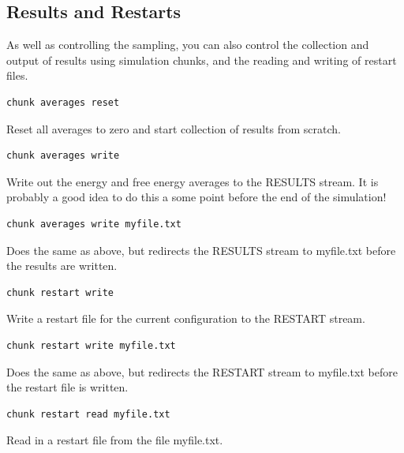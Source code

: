 \documentclass[letterpaper,10pt,english]{sphinxmanual}
\begin{document}
\subsection{Results and Restarts}
\label{protoms:results-and-restarts}
As well as controlling the sampling, you can also control the collection and output of results using simulation chunks, and the reading and writing of restart files.

\begin{Verbatim}[commandchars=\\\{\}]
chunk averages reset
\end{Verbatim}

Reset all averages to zero and start collection of results from scratch.

\begin{Verbatim}[commandchars=\\\{\}]
chunk averages write
\end{Verbatim}

Write out the energy and free energy averages to the RESULTS stream. It is probably a good idea to do this a some point before the end of the simulation!

\begin{Verbatim}[commandchars=\\\{\}]
chunk averages write myfile.txt
\end{Verbatim}

Does the same as above, but redirects the RESULTS stream to myfile.txt before the results are written.

\begin{Verbatim}[commandchars=\\\{\}]
chunk restart write
\end{Verbatim}

Write a restart file for the current configuration to the RESTART stream.

\begin{Verbatim}[commandchars=\\\{\}]
chunk restart write myfile.txt
\end{Verbatim}

Does the same as above, but redirects the RESTART stream to myfile.txt before the restart file is written.

\begin{Verbatim}[commandchars=\\\{\}]
chunk restart read myfile.txt
\end{Verbatim}

Read in a restart file from the file myfile.txt.
\end{document}

